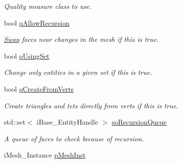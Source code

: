 \begin{DoxyCompactItemize}
\begin{DoxyCompactList}\small\item\em Quality measure class to use. \item\end{DoxyCompactList}\item 
bool \hyperlink{class_i_t_a_p_s___swap_1_1_swap_a400dea547bf0c4984d630e2b044a1316}{qAllowRecursion}
\begin{DoxyCompactList}\small\item\em \hyperlink{class_i_t_a_p_s___swap_1_1_swap}{Swap} faces near changes in the mesh if this is true. \item\end{DoxyCompactList}\item 
bool \hyperlink{class_i_t_a_p_s___swap_1_1_swap_ab6c9bfbc58fd9272e3706fa3ce4392c6}{qUsingSet}
\begin{DoxyCompactList}\small\item\em Change only entities in a given set if this is true. \item\end{DoxyCompactList}\item 
bool \hyperlink{class_i_t_a_p_s___swap_1_1_swap_a37fb33f35799bd3750b2f8fcf32fe81a}{qCreateFromVerts}
\begin{DoxyCompactList}\small\item\em Create triangles and tets directly from verts if this is true. \item\end{DoxyCompactList}\item 
std::set$<$ iBase\_\-EntityHandle $>$ \hyperlink{class_i_t_a_p_s___swap_1_1_swap_ab49c1d524e26177afb0c0f76181304d7}{soRecursionQueue}
\begin{DoxyCompactList}\small\item\em A queue of faces to check because of recursion. \item\end{DoxyCompactList}\item 
\hypertarget{class_i_t_a_p_s___swap_1_1_swap_ad7e45831ec19da09b279a4b39e690429}{
iMesh\_\-Instance \hyperlink{class_i_t_a_p_s___swap_1_1_swap_ad7e45831ec19da09b279a4b39e690429}{pMeshInst}}
\label{class_i_t_a_p_s___swap_1_1_swap_ad7e45831ec19da09b279a4b39e690429}


\end{DoxyCompactItemize}

